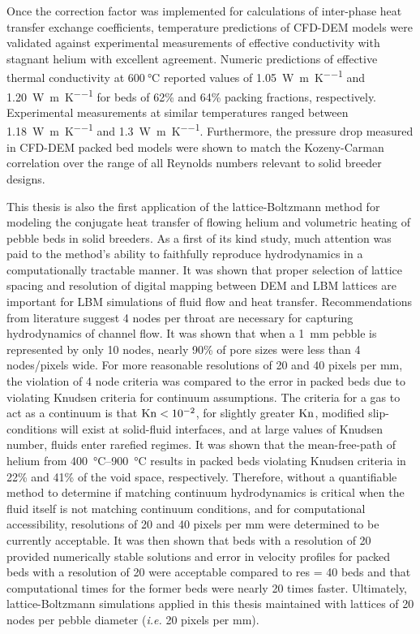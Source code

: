 Once the correction factor was implemented for calculations of inter-phase heat transfer exchange coefficients, temperature predictions of CFD-DEM models were validated against experimental measurements of effective conductivity with stagnant helium with excellent agreement. Numeric predictions of effective thermal conductivity at $\SI{600}{\celsius}$ reported values of \SI{1.05}{\watt\per\meter\per\kelvin} and \SI{1.20}{\watt\per\meter\per\kelvin} for beds of 62\% and 64\% packing fractions, respectively. Experimental measurements at similar temperatures ranged between \SI{1.18}{\watt\per\meter\per\kelvin} and \SI{1.3}{\watt\per\meter\per\kelvin}. Furthermore, the pressure drop measured in CFD-DEM packed bed models were shown to match the Kozeny-Carman correlation over the range of all Reynolds numbers relevant to solid breeder designs.

This thesis is also the first application of the lattice-Boltzmann method for modeling the conjugate heat transfer of flowing helium and volumetric heating of pebble beds in solid breeders. As a first of its kind study, much attention was paid to the method's ability to faithfully reproduce hydrodynamics in a computationally tractable manner. It was shown that proper selection of lattice spacing and resolution of digital mapping between DEM and LBM lattices are important for LBM simulations of fluid flow and heat transfer. Recommendations from literature suggest 4 nodes per throat are necessary for capturing hydrodynamics of channel flow. It was shown that when a \SI{1}{\milli\meter} pebble is represented by only 10 nodes, nearly 90\% of pore sizes were less than 4 nodes/pixels wide. For more reasonable resolutions of 20 and 40 pixels per \si{\milli\meter}, the violation of 4 node criteria was compared to the error in packed beds due to violating Knudsen criteria for continuum assumptions. The criteria for a gas to act as a continuum is that $\mathrm{Kn} < 10^{-2}$, for slightly greater $\mathrm{Kn}$, modified slip-conditions will exist at solid-fluid interfaces, and at large values of Knudsen number, fluids enter rarefied regimes. It was shown that the mean-free-path of helium from \SIrange{400}{900}{\celsius} results in packed beds violating Knudsen criteria in 22\% and 41\% of the void space, respectively. Therefore, without a quantifiable method to determine if matching continuum hydrodynamics is critical when the fluid itself is not matching continuum conditions, and for computational accessibility, resolutions of 20 and 40 pixels per \si{\milli\meter} were determined to be currently acceptable. It was then shown that beds with a resolution of 20 provided numerically stable solutions and error in velocity profiles for packed beds with a resolution of 20 were acceptable compared to res = 40 beds and that computational times for the former beds were nearly 20 times faster. Ultimately, lattice-Boltzmann simulations applied in this thesis maintained with lattices of 20 nodes per pebble diameter (\textit{i.e.} 20 pixels per \si{\milli\meter}).

